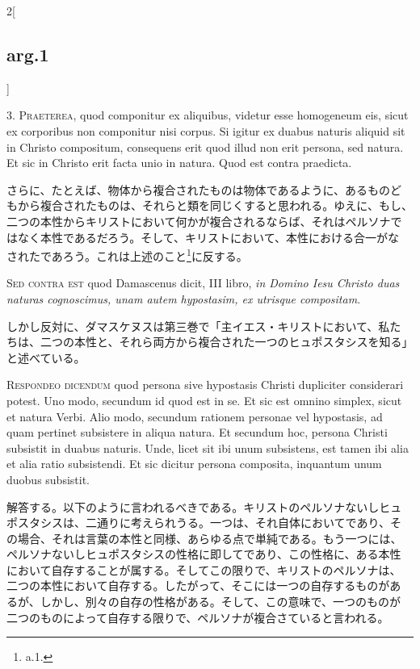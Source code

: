 \documentclass[paper=a4paper,fontsize=10pt,jafontsize=9pt,titlepage]{jlreq}
\begin{document}
\begin{paracol}{2}[\subsection{arg.1}]

3. {\scshape Praeterea}, quod componitur ex aliquibus, videtur esse
homogeneum eis, sicut ex corporibus non componitur nisi corpus. Si
igitur ex duabus naturis aliquid sit in Christo compositum, consequens
erit quod illud non erit persona, sed natura. Et sic in Christo erit
facta unio in natura. Quod est contra praedicta.

\switchcolumn

さらに、たとえば、物体から複合されたものは物体であるように、あるものど
もから複合されたものは、それらと類を同じくすると思われる。ゆえに、もし、
二つの本性からキリストにおいて何かが複合されるならば、それはペルソナで
はなく本性であるだろう。そして、キリストにおいて、本性における合一がな
されたであろう。これは上述のこと\footnote{a.1.}に反する。

\switchcolumn*[\subsection{s.c.}]

{\scshape Sed contra est} quod Damascenus dicit, III libro, {\itshape
in Domino Iesu Christo duas naturas cognoscimus, unam autem
hypostasim, ex utrisque compositam}.

\switchcolumn

しかし反対に、ダマスケヌスは第三巻で「主イエス・キリストにおいて、私た
ちは、二つの本性と、それら両方から複合された一つのヒュポスタシスを知る」
と述べている。


{\scshape Respondeo dicendum} quod persona sive hypostasis Christi
dupliciter considerari potest. Uno modo, secundum id quod est in
se. Et sic est omnino simplex, sicut et natura Verbi. Alio modo,
secundum rationem personae vel hypostasis, ad quam pertinet subsistere
in aliqua natura. Et secundum hoc, persona Christi subsistit in duabus
naturis. Unde, licet sit ibi unum subsistens, est tamen ibi alia et
alia ratio subsistendi. Et sic dicitur persona composita, inquantum
unum duobus subsistit.

\switchcolumn

解答する。以下のように言われるべきである。キリストのペルソナないしヒュ
ポスタシスは、二通りに考えられうる。一つは、それ自体においてであり、そ
の場合、それは言葉の本性と同様、あらゆる点で単純である。もう一つには、
ペルソナないしヒュポスタシスの性格に即してであり、この性格に、ある本性
において自存することが属する。そしてこの限りで、キリストのペルソナは、
二つの本性において自存する。したがって、そこには一つの自存するものがあ
るが、しかし、別々の自存の性格がある。そして、この意味で、一つのものが
二つのものによって自存する限りで、ペルソナが複合さていると言われる。


\end{paracol}
\end{document}
